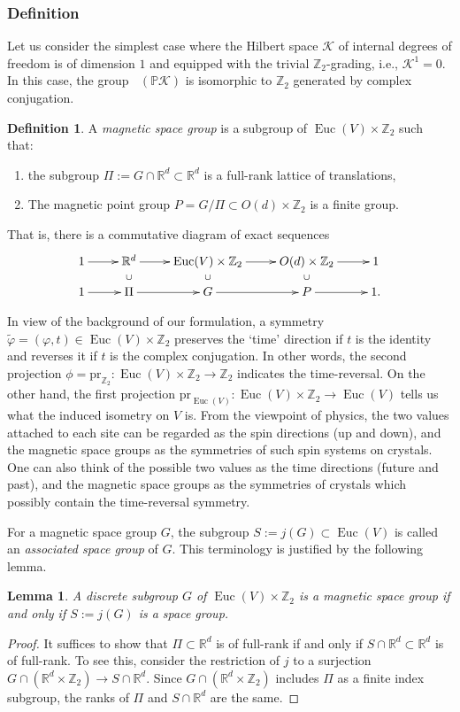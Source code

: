 \documentclass[11pt]{amsart}
\theoremstyle{definition}
\newtheorem{defn}[equation]{Definition}
\theoremstyle{plain}
\newtheorem{lem}[equation]{Lemma}
\theoremstyle{remark}
\newcommand{\bP}{\mathbb{P}}
\newcommand{\bR}{\mathbb{R}}
\newcommand{\bZ}{\mathbb{Z}}
\newcommand{\sK}{\mathscr{K}}
\DeclareMathOperator{\Euc}{Euc}
\newcommand{\pr}{\mathrm{pr}}
\DeclareMathOperator{\qAut}{\mathrm{Aut}_{\mathrm{qtm}}}
\begin{document}
\subsubsection{Definition}
Let us consider the simplest case where the Hilbert space $\sK$ of internal degrees of freedom is of dimension $1$ and equipped with the trivial $\bZ_2$-grading, i.e., $\sK^1=0$. In this case, the group $\qAut (\bP \sK)$ is isomorphic to $\bZ_2$ generated by complex conjugation.
\begin{defn}\label{defn:magnetic}
A \emph{magnetic space group} is a subgroup of $\Euc (V) \times \bZ_2$ such that:
\begin{enumerate}
\item the subgroup $\Pi:=G \cap \bR^d \subset \bR^d$ is a full-rank lattice of translations, 
\item The magnetic point group $P = G/\Pi \subset O(d) \times \bZ_2$ is a finite group.
\end{enumerate}
That is, there is a commutative diagram of exact sequences
\[
\xymatrix@R=1em{
1 \ar[r] & \bR^d \ar[r]\ar@{}[d]|{\cup} & \Euc(V) \times \bZ_2 \ar[r]\ar@{}[d]|{\cup} & O(d) \times \bZ_2 \ar[r]\ar@{}[d]|{\cup} & 1 \\
1 \ar[r] & \Pi \ar[r] & G \ar[r] &P \ar[r] & 1.
}
\] 
\end{defn}


In view of the background of our formulation, a symmetry $\tilde{\varphi} = (\varphi, t) \in \Euc(V) \times \bZ_2$ preserves the `time' direction if $t$ is the identity and reverses it if $t$ is the complex conjugation. In other words, the second projection $\phi=\pr_{\bZ_2} \colon \Euc(V) \times \bZ_2 \to \bZ_2$ indicates the time-reversal. On the other hand, the first projection $\pr_{\Euc(V)} \colon \Euc(V) \times \bZ_2 \to \Euc(V)$ tells us what the induced isometry on $V$ is. 
From the viewpoint of physics, the two values attached to each site can be regarded as the spin directions (up and down), and the magnetic space groups as the symmetries of such spin systems on crystals. One can also think of the possible two values as the time directions (future and past), and the magnetic space groups as the symmetries of crystals which possibly contain the time-reversal symmetry.

For a magnetic space group $G$, the subgroup $S:=j(G) \subset \Euc(V)$ is called an \emph{associated space group} of $G$. This terminology is justified by the following lemma.
\begin{lem}
A discrete subgroup $G$ of $\Euc(V) \times \bZ_2$ is a magnetic space group if and only if $S:=j(G)$ is a space group.
\end{lem}
\begin{proof}
It suffices to show that $\Pi \subset \bR^d$ is of full-rank if and only if $S \cap \bR^d \subset \bR^d$ is of full-rank. 
To see this, consider the restriction of $j$ to a surjection $ G\cap (\bR^d \times \bZ_2) \to S \cap \bR^d$. Since $G \cap (\bR^d \times \bZ_2)$ includes $\Pi$ as a finite index subgroup, the ranks of $\Pi$ and $S \cap \bR^d$ are the same.
\end{proof}
\end{document}
